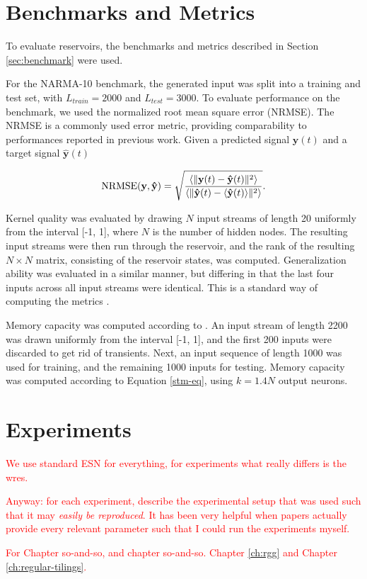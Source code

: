 \section{Benchmarks and Metrics}

To evaluate reservoirs, the benchmarks and metrics described in Section
\ref{sec:benchmark} were used.

For the NARMA-10 benchmark, the generated input was split into a training and
test set, with $L_{train} = 2000$ and $L_{test} = 3000$. To evaluate performance
on the benchmark, we used the normalized root mean square error (NRMSE). The
NRMSE is a commonly used error metric, providing comparability to performances
reported in previous work. Given a predicted signal $\mathbf{y}(t)$ and a target
signal $\mathbf{\hat{y}}(t)$

\begin{equation}
  \textrm{NRMSE}(\mathbf{y}, \mathbf{\hat{y}}) = \sqrt{\frac{
      \langle\Vert \mathbf{y}(t) - \mathbf{\hat{y}}(t) \Vert^{2}\rangle
    }{
      \langle\Vert \mathbf{\hat{y}}(t) - \langle\mathbf{\hat{y}}(t)\rangle \Vert^{2}\rangle
    }
  }
  .
  \label{eq:nrmse}
\end{equation}

Kernel quality was evaluated by drawing $N$ input streams of length 20 uniformly
from the interval [-1, 1], where $N$ is the number of hidden nodes. The
resulting input streams were then run through the reservoir, and the rank of the
resulting $N \times N$ matrix, consisting of the reservoir states, was
computed. Generalization ability was evaluated in a similar manner, but
differing in that the last four inputs across all input streams were
identical. This is a standard way of computing the metrics
\cite{busing_connectivity_2010}.

Memory capacity was computed according to \cite{farkas_computational_2016}. An
input stream of length 2200 was drawn uniformly from the interval [-1, 1], and
the first 200 inputs were discarded to get rid of transients. Next, an input
sequence of length 1000 was used for training, and the remaining 1000 inputs for
testing. Memory capacity was computed according to Equation \ref{stm-eq}, using
$k = 1.4N$ output neurons.

\section{Experiments}

\textcolor{red}{
  We use standard ESN for everything, for experiments what really differs is the
wres.
}

\textcolor{red}{
  Anyway: for each experiment, describe the experimental setup that was used
such that it may \textit{easily be reproduced}. It has been very helpful when
papers actually provide every relevant parameter such that I could run the
experiments myself.
}

\textcolor{red}{
  For Chapter so-and-so, and chapter so-and-so. Chapter \ref{ch:rgg} and Chapter
\ref{ch:regular-tilings}.
}




